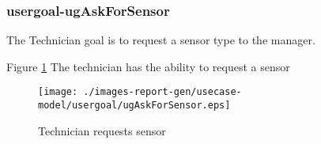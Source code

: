 \subsubsection{usergoal-ugAskForSensor}

\label{RE-use-case-ugAskForSensor}


The Technician goal is to request a sensor type to the manager.		  


\begin{usecase}
  






\addnumberedsinglerow{}{
}





\end{usecase} 


Figure \ref{fig:lu.uni.lassy.excalibur.group01.excalibur-RE-UCD-ugAskForSensor}
The technician has the ability to request a sensor

\begin{figure}[htbp]
\begin{center}

\texttt{[image: ./images-report-gen/usecase-model/usergoal/ugAskForSensor.eps]}
\end{center}
\caption[lu.uni.lassy.excalibur.group01.excalibur Use Case Diagram: ugAskForSensor]{Technician requests sensor}
\label{fig:lu.uni.lassy.excalibur.group01.excalibur-RE-UCD-ugAskForSensor}
\end{figure}
\vspace{0.5cm}
